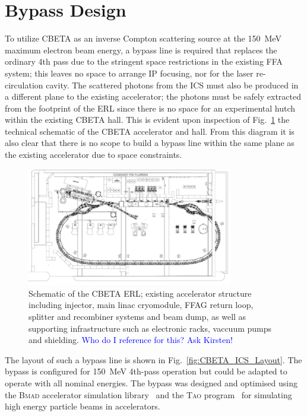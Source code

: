 \documentclass[../main.tex]{subfiles}
\begin{document}
\section{Bypass Design}

To utilize CBETA as an inverse Compton scattering source at the 150~\si{\mega\electronvolt} maximum electron beam energy, a bypass line is required that replaces the ordinary 4th pass due to the stringent space restrictions in the existing FFA system; this leaves no space to arrange IP focusing, nor for the laser re-circulation cavity. The scattered photons from the ICS must also be produced in a different plane to the existing accelerator; the photons must be safely extracted from the footprint of the ERL since there is no space for an experimental hutch within the existing CBETA hall. This is evident upon inspection of Fig.~\ref{fig:CBETA_schematic} the technical schematic of the CBETA accelerator and hall. From this diagram it is also clear that there is no scope to build a bypass line within the same plane as the existing accelerator due to space constraints.

\begin{figure}[!h]
\centering
\includegraphics[width=0.8\textwidth]{Figures/CBETA_Inverse_Compton_Source_Design/CBETA_schematic.pdf}
\caption{Schematic of the CBETA ERL; existing accelerator structure including injector, main linac cryomodule, FFAG return loop, splitter and recombiner systems and beam dump, as well as supporting infrastructure such as electronic racks, vaccuum pumps and shielding. \textcolor{blue}{Who do I reference for this? Ask Kirsten!}}
\label{fig:CBETA_schematic}
\end{figure}

The layout of such a bypass line is shown in Fig.~\ref{fig:CBETA_ICS_Layout}. The bypass is configured for 150~\si{\mega\electronvolt} 4th-pass operation but could be adapted to operate with all nominal energies. The bypass was designed and optimised using the \textsc{Bmad} accelerator simulation library~\cite{BmadManual} and the \textsc{Tao} program~\cite{TaoManual} for simulating high
energy particle beams in accelerators.
\end{document}
